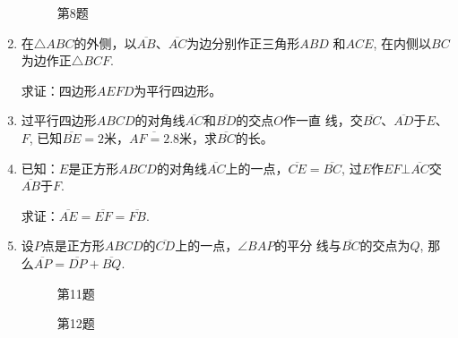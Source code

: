\begin{enumerate}
\begin{figure}[htp]
\begin{minipage}[t]{0.48\textwidth}
\begin{tikzpicture}[>=latex, scale=1]
    \end{tikzpicture}
    \caption*{第8题}
    \end{minipage}
    \end{figure}

\item 在$\triangle ABC$的外侧，以$\overline{AB}$、$\overline{AC}$为边分别作正三角形$ABD$
和$ACE$, 在内侧以$BC$为边作正$\triangle BCF$.

求证：四边形$AEFD$为平行四边形。
\item 过平行四边形$ABCD$的对角线$\overline{AC}$和$\overline{BD}$的交点$O$作一直
线，交$\overline{BC}$、$\overline{AD}$于$E$、$F$, 已知$\overline{BE}=2$米，$\overline{AF=2.8}$米，求$\overline{BC}$的长。
\item 已知：$E$是正方形$ABCD$的对角线$\overline{AC}$上的一点，$\overline{CE}=\overline{BC}$, 过$E$作$EF\bot \overline{AC}$交$\overline{AB}$于$F$.

求证：$\overline{AE}=\overline{EF}=\overline{FB}$.

\item 设$P$点是正方形$ABCD$的$\overline{CD}$上的一点，$\angle BAP$的平分
线与$\overline{BC}$的交点为$Q$, 那么$\overline{AP}=\overline{DP}+\overline{BQ}$.

\begin{figure}[htp]\centering
    \begin{minipage}[t]{0.48\textwidth}
    \centering
{}
    \caption*{第11题}
    \end{minipage}
    \begin{minipage}[t]{0.48\textwidth}
    \centering
    \caption*{第12题}
    \end{minipage}
    \end{figure}


\end{enumerate}
